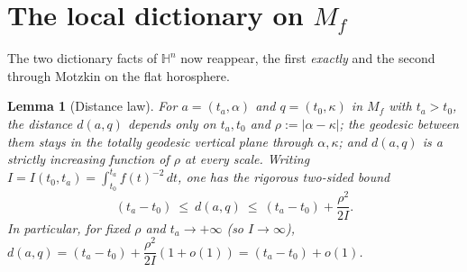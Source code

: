 \documentclass[11pt]{article}
\newtheorem{lemma}[theorem]{Lemma}
\theoremstyle{remark}
\newcommand{\Mf}{M_{f}}
\newcommand{\HH}{\mathbb{H}}
\begin{document}
\section{The local dictionary on \texorpdfstring{$\Mf$}{Mf}}
\label{sec:dict}

The two dictionary facts of $\HH^{n}$ now reappear, the first
\emph{exactly} and the second through Motzkin on the flat horosphere.

\begin{lemma}[Distance law]\label{lem:distlaw}
For $a=(t_{a},\alpha)$ and $q=(t_{0},\kappa)$ in $\Mf$ with
$t_{a}>t_{0}$, the distance $d(a,q)$ depends only on $t_{a},t_{0}$ and
$\rho:=|\alpha-\kappa|$; the geodesic between them stays in the totally
geodesic vertical plane through $\alpha,\kappa$; and $d(a,q)$ is a
strictly increasing function of $\rho$ at every scale. Writing
$I=I(t_{0},t_{a})=\int_{t_{0}}^{t_{a}}f(t)^{-2}\,dt$, one has the
rigorous two-sided bound
\[
  (t_{a}-t_{0})\ \le\ d(a,q)\ \le\ (t_{a}-t_{0})+\frac{\rho^{2}}{2I}.
\]
In particular, for fixed $\rho$ and $t_{a}\to+\infty$ (so
$I\to\infty$), $d(a,q)=(t_{a}-t_{0})+\dfrac{\rho^{2}}{2I}(1+o(1))
=(t_{a}-t_{0})+o(1)$.
\end{lemma}
\end{document}
